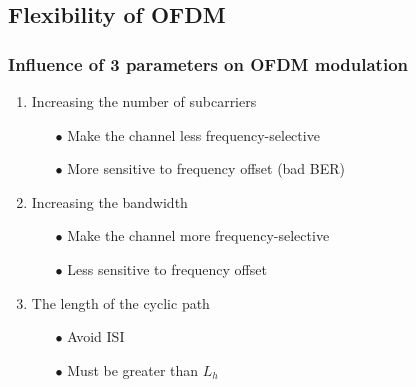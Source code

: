 \documentclass[11pt]{beamer}
\begin{document}
\subsection{Flexibility of OFDM}

\begin{frame}
\frametitle{Influence of 3 parameters on OFDM modulation}

\begin{enumerate}
\item Increasing the number of subcarriers

	\begin{itemize}
		\item[$\bullet$] Make the channel less frequency-selective
		\item[$\bullet$] More sensitive to frequency offset (bad BER)	
	\end{itemize}
	
\item Increasing the bandwidth
	\begin{itemize}
		\item[$\bullet$] Make the channel more frequency-selective
		\item[$\bullet$] Less sensitive to frequency offset
	\end{itemize}

\item The length of the cyclic path	
	\begin{itemize}
		\item[$\bullet$] Avoid ISI
		\item[$\bullet$] Must be greater than $L_h$
	\end{itemize}	

\end{enumerate}

\end{frame}
\end{document}
